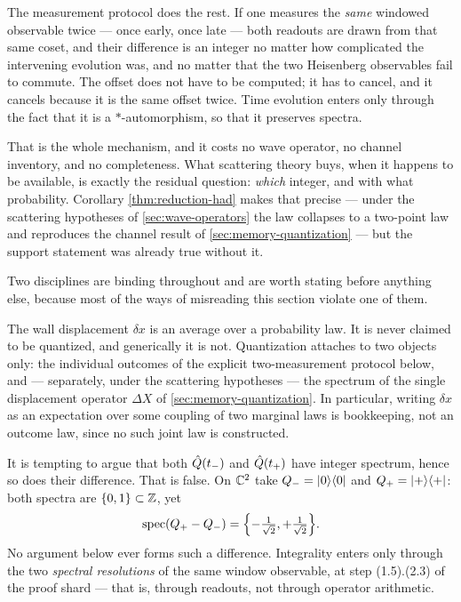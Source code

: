 The measurement protocol does the rest. If one measures the \emph{same}
windowed observable twice --- once early, once late --- both readouts are drawn
from that same coset, and their difference is an integer no matter how
complicated the intervening evolution was, and no matter that the two
Heisenberg observables fail to commute. The offset does not have to be
computed; it has to cancel, and it cancels because it is the same offset
twice. Time evolution enters only through the fact that it is a
$*$-automorphism, so that it preserves spectra.

That is the whole mechanism, and it costs no wave operator, no channel
inventory, and no completeness. What scattering theory buys, when it happens
to be available, is exactly the residual question: \emph{which} integer, and
with what probability. Corollary \ref{thm:reduction-had} makes that precise
--- under the scattering hypotheses of \cref{sec:wave-operators} the law
collapses to a two-point law and reproduces the channel result of
\cref{sec:memory-quantization} --- but the support statement was already true
without it.

Two disciplines are binding throughout and are worth stating before anything
else, because most of the ways of misreading this section violate one of them.

\begin{remark}
\label{ref:register-discipline}
The wall displacement $\delta x$ is an average over a probability law. It is
never claimed to be quantized, and generically it is not. Quantization
attaches to two objects only: the individual outcomes of the explicit
two-measurement protocol below, and --- separately, under the scattering
hypotheses --- the spectrum of the single displacement operator $\Delta X$ of
\cref{sec:memory-quantization}. In particular, writing $\delta x$ as an
expectation over some coupling of two marginal laws is bookkeeping, not an
outcome law, since no such joint law is constructed.
\end{remark}

\begin{remark}
\label{ref:noncommuting-landmine}
It is tempting to argue that both $\hat{Q}(t_-)$ and $\hat{Q}(t_+)$ have integer
spectrum, hence so does their difference. That is false. On $\mathbb{C}^2$ take
$Q_-=|0\rangle\langle 0|$ and $Q_+=|+\rangle\langle +|$: both spectra are
$\{0,1\}\subset\mathbb{Z}$, yet
\begin{equation}
  \operatorname{spec}(Q_+-Q_-)=\Bigl\{-\tfrac{1}{\sqrt2},+\tfrac{1}{\sqrt2}\Bigr\}.
  \label{eq:noncommuting-landmine}
\end{equation}
No argument below ever forms such a difference. Integrality enters only
through the two \emph{spectral resolutions} of the same window observable, at
step (1.5).(2.3) of the proof shard --- that is, through readouts, not through
operator arithmetic.
\end{remark}

